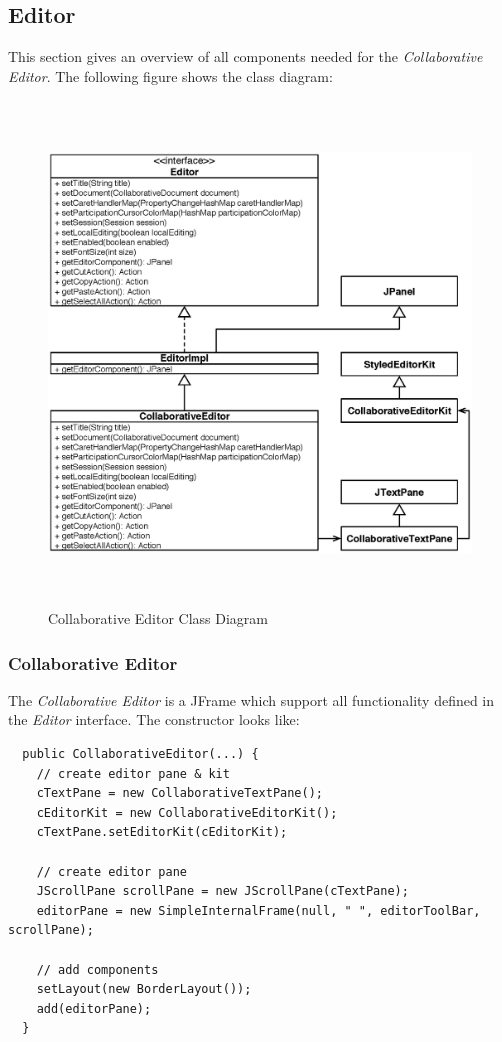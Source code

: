 \subsection{Editor}
This section gives an overview of all components needed for the \textit{Collaborative Editor}. The following figure shows the class diagram:
\begin{figure}[H]
\begin{center}
  \includegraphics[height=5.25in, width=5.55in]{../images/finalreport/application_editor.eps}
\caption{Collaborative Editor Class Diagram}
\label{application_editor}
\end{center}
\end{figure}

\subsubsection{Collaborative Editor}
The \textit{Collaborative Editor} is a JFrame which support all functionality defined in the \textit{Editor} interface. The constructor looks like:
\begin{verbatim}
  public CollaborativeEditor(...) {
    // create editor pane & kit
    cTextPane = new CollaborativeTextPane();
    cEditorKit = new CollaborativeEditorKit();
    cTextPane.setEditorKit(cEditorKit);

    // create editor pane
    JScrollPane scrollPane = new JScrollPane(cTextPane);
    editorPane = new SimpleInternalFrame(null, " ", editorToolBar, scrollPane);

    // add components		
    setLayout(new BorderLayout());
    add(editorPane);    
  }
\end{verbatim}

